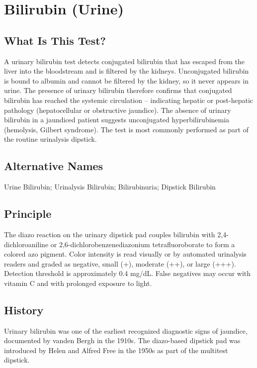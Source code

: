 \chapter{Bilirubin (Urine)}

\section*{What Is This Test?}
A urinary bilirubin test detects conjugated bilirubin that has escaped from the liver into the bloodstream and is filtered by the kidneys. Unconjugated bilirubin is bound to albumin and cannot be filtered by the kidney, so it never appears in urine. The presence of urinary bilirubin therefore confirms that conjugated bilirubin has reached the systemic circulation -- indicating hepatic or post-hepatic pathology (hepatocellular or obstructive jaundice). The absence of urinary bilirubin in a jaundiced patient suggests unconjugated hyperbilirubinemia (hemolysis, Gilbert syndrome). The test is most commonly performed as part of the routine urinalysis dipstick.

\section*{Alternative Names}
Urine Bilirubin; Urinalysis Bilirubin; Bilirubinuria; Dipstick Bilirubin

\section*{Principle}
The diazo reaction on the urinary dipstick pad couples bilirubin with 2,4-dichloroaniline or 2,6-dichlorobenzenediazonium tetrafluoroborate to form a colored azo pigment. Color intensity is read visually or by automated urinalysis readers and graded as negative, small (+), moderate (++), or large (+++). Detection threshold is approximately 0.4 mg/dL. False negatives may occur with vitamin C and with prolonged exposure to light.

\section*{History}
Urinary bilirubin was one of the earliest recognized diagnostic signs of jaundice, documented by vanden Bergh in the 1910s. The diazo-based dipstick pad was introduced by Helen and Alfred Free in the 1950s as part of the multitest dipstick.

